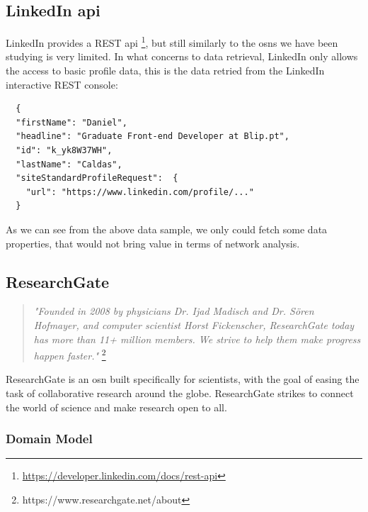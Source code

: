 \subsection*{LinkedIn \gls{api}}
LinkedIn provides a REST \gls{api} \footnote{\url{https://developer.linkedin.com/docs/rest-api}}, but still similarly to the \glspl{osn} we have been studying is very limited. In what concerns to data retrieval, LinkedIn only allows
the access to basic profile data, this is the data retried from the LinkedIn interactive REST console:\\

\begin{verbatim}
  {
  "firstName": "Daniel",
  "headline": "Graduate Front-end Developer at Blip.pt",
  "id": "k_yk8W37WH",
  "lastName": "Caldas",
  "siteStandardProfileRequest":  {
    "url": "https://www.linkedin.com/profile/..."
  }
\end{verbatim}

\indent As we can see from the above data sample, we only could fetch some data properties, that would not bring value in terms of network analysis.

\subsection{ResearchGate}

\begin{quote}
\textit{"Founded in 2008 by physicians Dr. Ijad Madisch and Dr. Sören Hofmayer, and computer scientist
Horst Fickenscher, ResearchGate today has more than 11+ million members. We strive to help them make progress happen faster."} \footnote{https://www.researchgate.net/about}
\end{quote}

ResearchGate is an \gls{osn} built specifically for scientists, with the goal of easing the task of collaborative research around the globe. ResearchGate
strikes to connect the world of science and make research open to all.
\clearpage

\subsubsection*{Domain Model}


